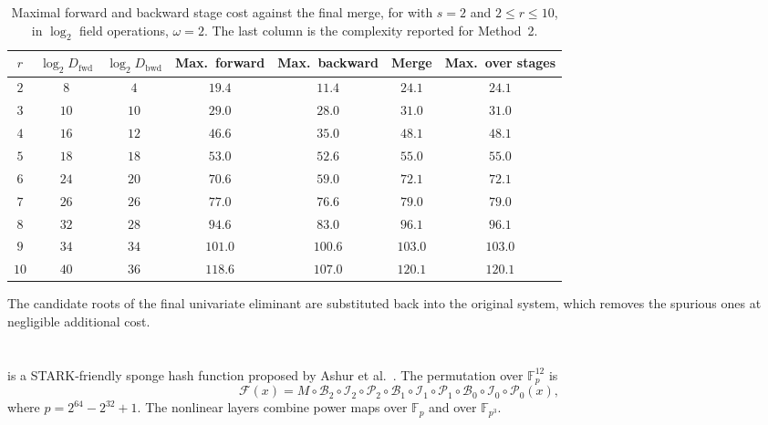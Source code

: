 \begin{table}[ht]
	\centering
	\small
	\caption{Maximal forward and backward stage cost against the final merge, for \vision with $s=2$ and $2\le r\le 10$, in $\log_2$ field operations, $\omega=2$. The last column is the complexity reported for Method~2.}
	\label{tab:vision_stages_all}
	\setlength{\tabcolsep}{4pt}
	\renewcommand{\arraystretch}{1.1}
	\begin{tabular}{@{}ccccccc@{}}
		\toprule
		$r$ & $\log_2 D_{\mathrm{fwd}}$ & $\log_2 D_{\mathrm{bwd}}$ & Max.\ forward & Max.\ backward & Merge & Max.\ over stages \\
		\midrule
		$2$  & $8$  & $4$  & $19.4$  & $11.4$  & $24.1$  & $24.1$ \\
		$3$  & $10$ & $10$ & $29.0$  & $28.0$  & $31.0$  & $31.0$ \\
		$4$  & $16$ & $12$ & $46.6$  & $35.0$  & $48.1$  & $48.1$ \\
		$5$  & $18$ & $18$ & $53.0$  & $52.6$  & $55.0$  & $55.0$ \\
		$6$  & $24$ & $20$ & $70.6$  & $59.0$  & $72.1$  & $72.1$ \\
		$7$  & $26$ & $26$ & $77.0$  & $76.6$  & $79.0$  & $79.0$ \\
		$8$  & $32$ & $28$ & $94.6$  & $83.0$  & $96.1$  & $96.1$ \\
		$9$  & $34$ & $34$ & $101.0$ & $100.6$ & $103.0$ & $103.0$ \\
		$10$ & $40$ & $36$ & $118.6$ & $107.0$ & $120.1$ & $120.1$ \\
		\bottomrule
	\end{tabular}
\end{table}

The candidate roots of the final univariate eliminant are substituted back into the original system, which removes the spurious ones at negligible additional cost.

\newpage
\section{\texorpdfstring{\xhash}{XHash12}}
\label{appendix:xhash}

\xhash is a STARK-friendly sponge hash function proposed by Ashur et al.~\cite{DBLP:journals/iacr/AshurKM23}. The permutation over $\mathbb{F}_p^{12}$ is
\[
\mathcal{F}(x) =  M\circ \mathcal{B}_2 \circ \mathcal{I}_2\circ \mathcal{P}_2 \circ  \mathcal{B}_1 \circ \mathcal{I}_1\circ \mathcal{P}_1 \circ \mathcal{B}_0 \circ  \mathcal{I}_0\circ \mathcal{P}_0(x),
\]
where $p = 2^{64}-2^{32}+1$. The nonlinear layers combine power maps over $\mathbb{F}_p$ and over $\mathbb{F}_{p^3}$.

